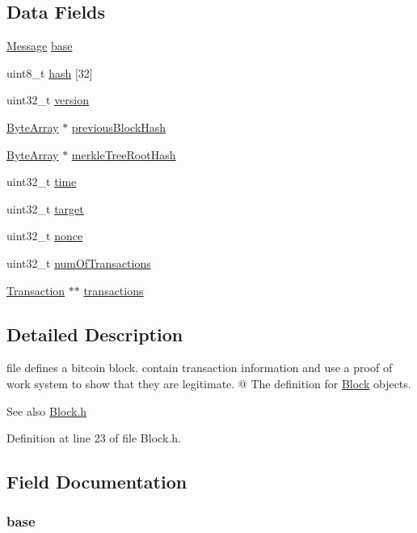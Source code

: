 \subsection*{Data Fields}
\begin{DoxyCompactItemize}
\item 
\hyperlink{struct_m_i_message}{Message} \hyperlink{struct_m_i_block_a487e4843cf1cf7397eb2e1bcf91cbf3b}{base}
\item 
uint8\_\-t \hyperlink{struct_m_i_block_a7ff9da008bf055da1f1ba994c562057d}{hash} \mbox{[}32\mbox{]}
\item 
uint32\_\-t \hyperlink{struct_m_i_block_acd99bb05ca015e7d74448acb1deba7ca}{version}
\item 
\hyperlink{struct_m_i_byte_array}{ByteArray} $\ast$ \hyperlink{struct_m_i_block_a942caf6700f7eee4a96b41503337886c}{previousBlockHash}
\item 
\hyperlink{struct_m_i_byte_array}{ByteArray} $\ast$ \hyperlink{struct_m_i_block_a04cf19a780652ad8d0123ed9fa18b408}{merkleTreeRootHash}
\item 
uint32\_\-t \hyperlink{struct_m_i_block_ae73654f333e4363463ad8c594eca1905}{time}
\item 
uint32\_\-t \hyperlink{struct_m_i_block_a695e5800ad1fd403c0e72d918eaec97c}{target}
\item 
uint32\_\-t \hyperlink{struct_m_i_block_aa2f9785a9d9116cc4592db06375cb887}{nonce}
\item 
uint32\_\-t \hyperlink{struct_m_i_block_ac9749ca92207f8d50ecc2b0f904e2424}{numOfTransactions}
\item 
\hyperlink{struct_m_i_transaction}{Transaction} $\ast$$\ast$ \hyperlink{struct_m_i_block_a722f3f2bbe4a11072741a214e2750a42}{transactions}
\end{DoxyCompactItemize}


\subsection{Detailed Description}
file defines a bitcoin block.  contain transaction information and use a proof of work system to show that they are legitimate. @ The definition for \hyperlink{struct_m_i_block}{Block} objects. \begin{DoxySeeAlso}{See also}
\hyperlink{_m_i_block_8h}{Block.h} 
\end{DoxySeeAlso}


Definition at line 23 of file Block.h.



\subsection{Field Documentation}
\hypertarget{struct_m_i_block_a487e4843cf1cf7397eb2e1bcf91cbf3b}{
\subsubsection[{base}]{ {\bf base}}}
\label{struct_m_i_block_a487e4843cf1cf7397eb2e1bcf91cbf3b}


